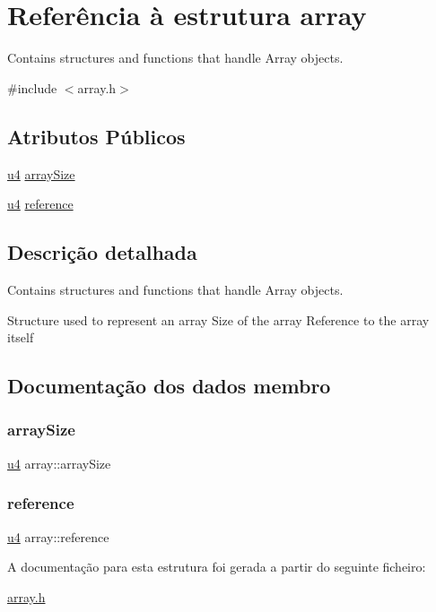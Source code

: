 \hypertarget{structarray}{}\section{Referência à estrutura array}
\label{structarray}


Contains structures and functions that handle Array objects.  




{\ttfamily \#include $<$array.\+h$>$}

\subsection*{Atributos Públicos}
\begin{DoxyCompactItemize}
\item 
\hyperlink{util_8h_ae391a1d79bb0c8cbc283f0283e3c098b}{u4} \hyperlink{structarray_afd6a9d4019541e07d2cf97b721604a38}{array\+Size}
\item 
\hyperlink{util_8h_ae391a1d79bb0c8cbc283f0283e3c098b}{u4} \hyperlink{structarray_a37b31732682b8f1bbb21b4882934abd9}{reference}
\end{DoxyCompactItemize}


\subsection{Descrição detalhada}
Contains structures and functions that handle Array objects. 

Structure used to represent an array  Size of the array  Reference to the array itself 

\subsection{Documentação dos dados membro}
\mbox{\label{structarray_afd6a9d4019541e07d2cf97b721604a38}} 
\subsubsection{\texorpdfstring{array\+Size}{arraySize}}
{\footnotesize\ttfamily \hyperlink{util_8h_ae391a1d79bb0c8cbc283f0283e3c098b}{u4} array\+::array\+Size}

\mbox{\label{structarray_a37b31732682b8f1bbb21b4882934abd9}} 
\subsubsection{\texorpdfstring{reference}{reference}}
{\footnotesize\ttfamily \hyperlink{util_8h_ae391a1d79bb0c8cbc283f0283e3c098b}{u4} array\+::reference}



A documentação para esta estrutura foi gerada a partir do seguinte ficheiro\+:\begin{DoxyCompactItemize}
\item 
\hyperlink{array_8h}{array.\+h}\end{DoxyCompactItemize}
